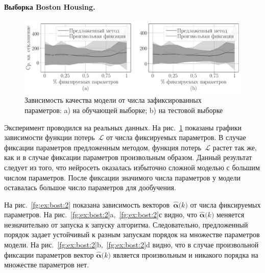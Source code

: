 \paragraph{Выборка Boston Housing.}
\begin{figure}[h!t]\center
\includegraphics[width=1\textwidth]{results/order/boston_data_loss}
\caption{Зависимость качества модели от числа зафиксированных параметров: a) на обучающей выборке; b) на тестовой выборке}
\label{fg:ex:bost:1}
\end{figure}
Эксперимент проводился на реальных данных.
На рис.~\ref{fg:ex:bost:1} показаны графики зависимости функции потерь~$\mathcal{L}$ от числа фиксируемых параметров. В случае фиксации параметров предложенным методом, функция потерь~$\mathcal{L}$ растет так же, как и в случае фиксации параметров произвольным образом.
Данный результат следует из того, что нейросеть оказалась избыточно сложной моделью с большим числом параметров. После фиксации значимого числа параметров у модели оставалась большое число параметров для дообучения.

На рис.~\ref{fg:ex:bost:2} показана зависимость векторов~$\hat{\bm{\alpha}}\bigr(k\bigr)$ от числа фиксируемых параметров. На рис.~\ref{fg:ex:bost:2}a,~\ref{fg:ex:bost:2}с видно, что $\hat{\bm{\alpha}}\bigr(k\bigr)$ меняется незначительно от запуска к запуску алгоритма. Следовательно, предложенный порядок задает устойчивый к разным запускам порядок на множестве параметров модели. На рис.~\ref{fg:ex:bost:2}b,~\ref{fg:ex:bost:2}d видно, что в случае произвольной фиксации параметров вектор $\hat{\bm{\alpha}}\bigr(k\bigr)$ является произвольным и никакого порядка на множестве параметров нет.

